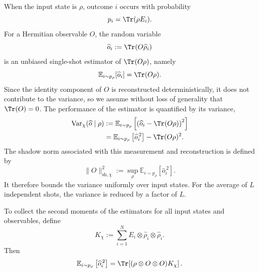 \documentclass[aps,twocolumn,pra,superscriptaddress,nofootinbib]{revtex4-2}
\begin{document}
{When the input state is $\rho$, outcome $i$ occurs with probability
\begin{equation}
    p_i=\Tr(\rho E_i).
\end{equation}
For a Hermitian observable $O$, the random variable
\begin{equation}
    \widehat{o}_i:=\Tr(O\widehat{\rho}_i)
\end{equation}
is an unbiased single-shot estimator of $\Tr(O\rho)$, namely
\begin{equation}
    \mathbb{E}_{i\sim p_\rho}[\widehat{o}_i]
    =
    \Tr(O\rho).
\end{equation}
Since the identity component of $O$ is reconstructed deterministically, it does not contribute to the variance, so we assume without loss of generality that $\Tr(O)=0$. The performance of the estimator is quantified by its variance,
\begin{align}
    \operatorname{Var}_{\chi}(\widehat{o}\mid\rho)
    &:=
    \mathbb{E}_{i\sim p_\rho}
    \left[
        \left(
            \widehat{o}_i-\Tr(O\rho)
        \right)^{2}
    \right]
    \nonumber\\
    &=
    \mathbb{E}_{i\sim p_\rho}
    \left[
        \widehat{o}_i^{\,2}
    \right]
    -
    \Tr(O\rho)^{2}.
    \label{eq:shadow-variance-definition}
\end{align}
The shadow norm associated with this measurement and reconstruction is defined by~\cite{Huang2020Predicting,Innocenti2023}
\begin{equation}
    \|O\|_{\mathrm{sh},\chi}^{2}
    :=
    \sup_{\rho}
    \mathbb{E}_{i\sim p_\rho}
    \left[\widehat{o}_i^{\,2}\right].
    \label{eq:shadow-norm-definition}
\end{equation}
It therefore bounds the variance uniformly over input states. For the average of $L$ independent shots, the variance is reduced by a factor of $L$.

To collect the second moments of the estimators for all input states and observables, define
\begin{equation}
    K_{\chi}
    :=
    \sum_{i=1}^{N}
    E_i\otimes\widehat{\rho}_i\otimes\widehat{\rho}_i.
    \label{eq:shadow-second-moment-operator}
\end{equation}
Then
\begin{equation}
    \mathbb{E}_{i\sim p_\rho}
    \left[
        \widehat{o}_i^{\,2}
    \right]
    =
    \Tr\!\left[
        (\rho\otimes O\otimes O)K_{\chi}
    \right].
    \label{eq:shadow-second-moment}
\end{equation}

}
\end{document}
